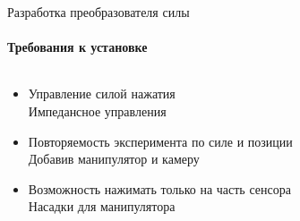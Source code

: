 \documentclass[aspectratio=169,xcolor=table,10pt]{beamer}
\begin{document}
\begin{frame}[t]{Разработка преобразователя силы}
    \framesubtitle{Требования к установке}
    \vspace{-0.5cm}
    \begin{columns}[T,onlytextwidth]
        \begin{column}{0.39\textwidth}
            \begin{itemize}
                \item Управление силой нажатия {\\ \alert{Импедансное управления}}
                \item Повторяемость эксперимента по силе и позиции{\\ \alert{Добавив манипулятор и камеру}}
                \item Возможность нажимать только на часть сенсора{\\ \alert{Насадки для манипулятора}}
            \end{itemize}
        \end{column}
        \begin{column}{0.8\textwidth}
\end{column}
\end{columns}
\end{frame}
\end{document}
